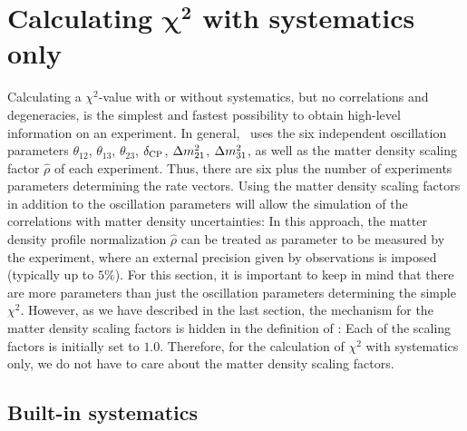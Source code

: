\chapter[Calculating $\chi^2$ with systematics only]{Calculating $\boldsymbol{\chi^2}$ with systematics only}

Calculating a $\chi^2$-value with or without systematics, but no correlations and degeneracies, is the simplest and fastest possibility to obtain high-level information on an experiment. In general, \GLOBES\ uses the six independent oscillation parameters $\theta_{12}$, $\theta_{13}$, $\theta_{23}$, $\delta_{\mathrm{CP}}$, $\Delta m_{21}^2$, $\Delta m_{31}^2$, as well as the matter density 
scaling factor $\hat{\rho}$ of each experiment. Thus, there are six plus the number of experiments parameters determining the rate vectors. Using the matter density scaling factors  in addition to the oscillation parameters will allow the simulation of the correlations with matter density uncertainties: In this
approach, the matter density profile normalization $\hat{\rho}$ can 
be treated
as parameter to be measured by the experiment, where an external precision
given by observations is imposed (typically up to $5\%$). 
 For this section, it is important to keep in mind
that there are more parameters than just the oscillation parameters
determining the simple $\chi^2$. However, as we have described in the
last section, the mechanism for the matter density scaling factors
is hidden in the definition of : Each of the scaling
factors is initially set to $1.0$. Therefore, for the calculation of
$\chi^2$ with systematics only, we do not have to care about the
matter density scaling factors.

\section{Built-in systematics}

